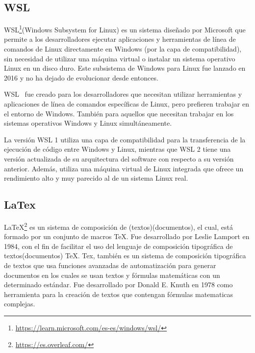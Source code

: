 \documentclass[a4paper, 12pt]{book}
\begin{document}
\subsection{WSL} %
\label{sec:wsl} %

WSL\footnote{\url{https://learn.microsoft.com/es-es/windows/wsl/}}(Windows Subsystem for Linux) es un sistema diseñado por Microsoft que permite a los desarrolladores ejecutar aplicaciones y herramientas de línea de comandos de Linux directamente en Windows (por la capa de compatibilidad), sin necesidad de utilizar una máquina virtual o instalar un sistema operativo Linux en un disco duro. 
Este subsistema de Windows para Linux fue lanzado en 2016 y no ha dejado de evolucionar desde entonces. 


WSL~\cite{medriforensic} fue creado para los desarrolladores que necesitan utilizar herramientas y aplicaciones de línea de comandos específicas de Linux, pero prefieren trabajar en el entorno de Windows. 
También para aquellos que necesitan trabajar en los sistemas operativos Windows y Linux simultáneamente.


La versión WSL 1 utiliza una capa de compatibilidad para la transferencia de la ejecución de código entre Windows y Linux,
mientras que WSL 2 tiene una versión actualizada de su arquitectura del software con respecto a su versión anterior. 
Además, utiliza una máquina virtual de Linux integrada que ofrece un rendimiento alto y muy parecido al de un sistema Linux real.



\subsection{LaTex} %
\label{sec:latex} %

LaTeX\footnote{\url{https://es.overleaf.com/}} es un sistema de composición de (textos)(documentos), el cual, está formado por un conjunto de macros TeX. 
Fue desarrollado por Leslie Lamport en 1984, con el fin de facilitar el uso del lenguaje de composición tipográfica de textos(documentos) TeX.
Tex, también es un sistema de composición tipográfica de textos que usa funciones avanzadas de automatización para generar documentos en los cuales se usan textos y fórmulas matemáticas con un determinado estándar.
Fue desarrollado por Donald E. Knuth en 1978 como herramienta para la creación de textos que contengan fórmulas matematicas complejas.
\end{document}

